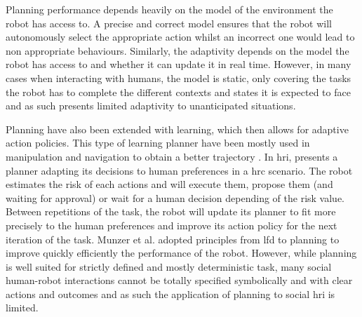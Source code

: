     Planning performance depends heavily on the model of the environment the robot has access to. A precise and correct model ensures that the robot will autonomously select the appropriate action whilst an incorrect one would lead to non appropriate behaviours. Similarly, the adaptivity depends on the model the robot has access to and whether it can update it in real time. However, in many cases when interacting with humans, the model is static, only covering the tasks the robot has to complete the different contexts and states it is expected to face and as such presents limited adaptivity to unanticipated situations.
    
    
    
    Planning have also been extended with learning, which then allows for adaptive action policies. This type of learning planner have been mostly used in manipulation and navigation to obtain a better trajectory \citep{jain2013learning,beetz2004rpllearn}. In \gls{hri}, \cite{munzer2017efficient} presents a planner adapting its decisions to human preferences in a \gls{hrc} scenario. The robot estimates the risk of each actions and will execute them, propose them (and waiting for approval) or wait for a human decision depending of the risk value. Between repetitions of the task, the robot will update its planner to fit more precisely to the human preferences and improve its action policy for the next iteration of the task. Munzer et al. adopted principles from \gls{lfd} to planning to improve quickly efficiently the performance of the robot. However, while planning is well suited for strictly defined and mostly deterministic task, many social human-robot interactions cannot be totally specified symbolically and with clear actions and outcomes and as such the application of planning to social \gls{hri} is limited.
	
	
	
